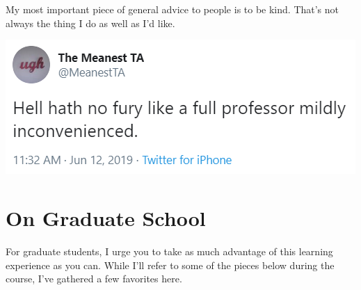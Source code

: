\documentclass[
]{book}
\begin{document}
My most important piece of general advice to people is to be kind. That's not always the thing I do as well as I'd like.

\includegraphics[width=0.8\linewidth]{images/2019-06-12_ta_fullprof}

\hypertarget{on-graduate-school}{%
\section{On Graduate School}\label{on-graduate-school}}

For graduate students, I urge you to take as much advantage of this learning experience as you can. While I'll refer to some of the pieces below during the course, I've gathered a few favorites here.
\end{document}
